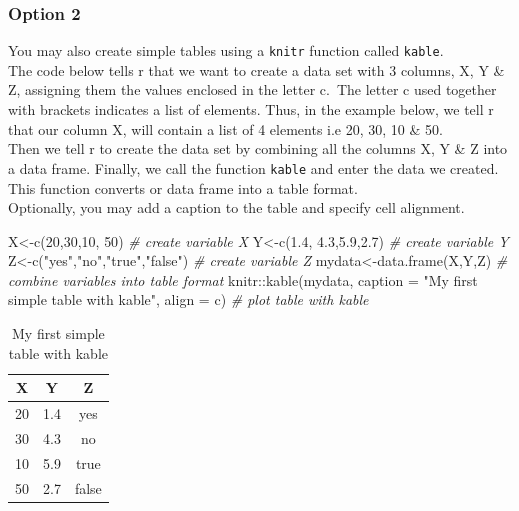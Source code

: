 \documentclass[
]{book}
\newenvironment{Shaded}{\begin{snugshade}}{\end{snugshade}}
\newcommand{\AttributeTok}[1]{\textcolor[rgb]{0.77,0.63,0.00}{#1}}
\newcommand{\CommentTok}[1]{\textcolor[rgb]{0.56,0.35,0.01}{\textit{#1}}}
\newcommand{\DecValTok}[1]{\textcolor[rgb]{0.00,0.00,0.81}{#1}}
\newcommand{\FloatTok}[1]{\textcolor[rgb]{0.00,0.00,0.81}{#1}}
\newcommand{\FunctionTok}[1]{\textcolor[rgb]{0.00,0.00,0.00}{#1}}
\newcommand{\NormalTok}[1]{#1}
\newcommand{\OtherTok}[1]{\textcolor[rgb]{0.56,0.35,0.01}{#1}}
\newcommand{\SpecialCharTok}[1]{\textcolor[rgb]{0.00,0.00,0.00}{#1}}
\newcommand{\StringTok}[1]{\textcolor[rgb]{0.31,0.60,0.02}{#1}}
\begin{document}
\hypertarget{option-2}{%
\subsubsection{Option 2}\label{option-2}}

You may also create simple tables using a \texttt{knitr} function called \texttt{kable}.\\
The code below tells r that we want to create a data set with 3 columns, X, Y \& Z, assigning them the values enclosed in the letter c.~The letter c used together with brackets indicates a list of elements. Thus, in the example below, we tell r that our column X, will contain a list of 4 elements i.e 20, 30, 10 \& 50.\\
Then we tell r to create the data set by combining all the columns X, Y \& Z into a data frame.
Finally, we call the function \texttt{kable} and enter the data we created. This function converts or data frame into a table format.\\
Optionally, you may add a caption to the table and specify cell alignment.

\begin{Shaded}
\begin{Highlighting}[]
\NormalTok{X}\OtherTok{\textless{}{-}}\FunctionTok{c}\NormalTok{(}\DecValTok{20}\NormalTok{,}\DecValTok{30}\NormalTok{,}\DecValTok{10}\NormalTok{, }\DecValTok{50}\NormalTok{)    }\CommentTok{\# create variable X}
\NormalTok{Y}\OtherTok{\textless{}{-}}\FunctionTok{c}\NormalTok{(}\FloatTok{1.4}\NormalTok{, }\FloatTok{4.3}\NormalTok{,}\FloatTok{5.9}\NormalTok{,}\FloatTok{2.7}\NormalTok{)    }\CommentTok{\# create variable Y}
\NormalTok{Z}\OtherTok{\textless{}{-}}\FunctionTok{c}\NormalTok{(}\StringTok{"yes"}\NormalTok{,}\StringTok{"no"}\NormalTok{,}\StringTok{"true"}\NormalTok{,}\StringTok{"false"}\NormalTok{)   }\CommentTok{\# create variable Z}
\NormalTok{mydata}\OtherTok{\textless{}{-}}\FunctionTok{data.frame}\NormalTok{(X,Y,Z) }\CommentTok{\# combine variables into table format}
\NormalTok{knitr}\SpecialCharTok{::}\FunctionTok{kable}\NormalTok{(mydata, }\AttributeTok{caption =} \StringTok{"My first simple table with kable"}\NormalTok{, }\AttributeTok{align =} \StringTok{\textquotesingle{}c\textquotesingle{}}\NormalTok{) }\CommentTok{\# plot table with kable}
\end{Highlighting}
\end{Shaded}

\begin{table}

\caption{\label{tab:unnamed-chunk-3}My first simple table with kable}
\centering
\begin{tabular}[t]{c|c|c}
\hline
X & Y & Z\\
\hline
20 & 1.4 & yes\\
\hline
30 & 4.3 & no\\
\hline
10 & 5.9 & true\\
\hline
50 & 2.7 & false\\
\hline
\end{tabular}
\end{table}
\end{document}
